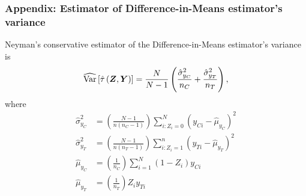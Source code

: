 \documentclass[table, xcolor = {dvipsnames}, 9pt]{beamer}
\theoremstyle{plain}
\DeclareMathOperator{\Var}{\rm{Var}}
\begin{document}
\begin{frame}[t, label = Variance estimators]
\frametitle{Appendix: Estimator of Difference-in-Means estimator's variance}
\vfill
Neyman's conservative estimator of the Difference-in-Means estimator's variance is 
\begin{equation*}
\widehat{\Var}\left[\hat{\tau}\left(\bm{Z}, \bm{Y}\right)\right] = \frac{N}{N - 1}\left(\frac{\hat{\sigma}^2_{y_C}}{n_C} + \frac{\hat{\sigma}^2_{y_T}}{n_T} \right),
\end{equation*}
where 
\begin{align*}
\hat{\sigma}^2_{y_C} & = \left(\frac{N - 1}{n\left(n_C - 1\right)}\right)\sum \limits_{i: Z_i = 0}^N \left(y_{Ci} - \hat{\mu}_{y_C}\right)^2 \\
\hat{\sigma}^2_{y_T} & = \left(\frac{N - 1}{n\left(n_T - 1\right)}\right)\sum \limits_{i: Z_i = 1}^{n} \left(y_{Ti} - \hat{\mu}_{y_T}\right)^2 \\ 
\hat{\mu}_{y_C} & = \left(\frac{1}{n_C}\right) \sum \limits_{i = 1}^N \left(1 - Z_i\right)y_{Ci} \\ 
\hat{\mu}_{y_T} & = \left(\frac{1}{n_T}\right) Z_i y_{Ti}
\end{align*}
\vfill
\end{frame}
\end{document}

